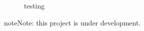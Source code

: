 \documentclass[a4paper,10pt,english,openany, oneside]{sphinxmanual}
\begin{document}
\begin{figure}[htbp]
\centering
\capstart

\noindent{}
\caption{testing}\label{\detokenize{test:id1}}\end{figure}

\begin{sphinxadmonition}{note}{Note:}
\sphinxAtStartPar
this project is under development.
\end{sphinxadmonition}


\renewcommand{\indexname}{Python Module Index}
\begin{sphinxtheindex}
\let\bigletter\sphinxstyleindexlettergroup
\bigletter{t}
\item\relax{}
\end{sphinxtheindex}

\renewcommand{\indexname}{Index}
\printindex
\end{document}
